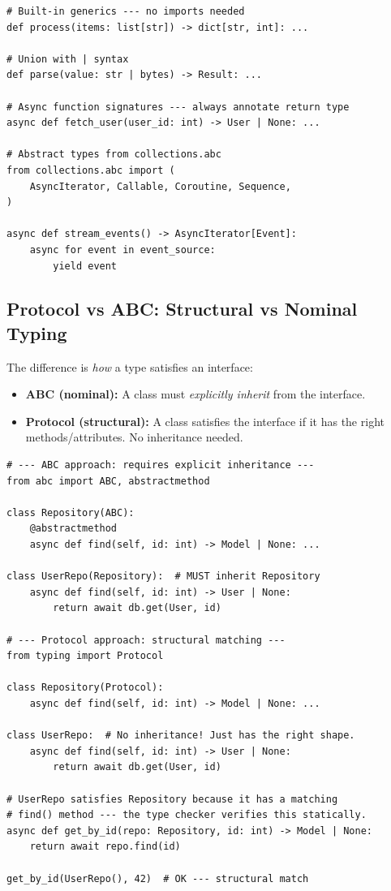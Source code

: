 \documentclass[11pt,a4paper,oneside]{book}
\begin{document}
\begin{lstlisting}[style=python]
# Built-in generics --- no imports needed
def process(items: list[str]) -> dict[str, int]: ...

# Union with | syntax
def parse(value: str | bytes) -> Result: ...

# Async function signatures --- always annotate return type
async def fetch_user(user_id: int) -> User | None: ...

# Abstract types from collections.abc
from collections.abc import (
    AsyncIterator, Callable, Coroutine, Sequence,
)

async def stream_events() -> AsyncIterator[Event]:
    async for event in event_source:
        yield event
\end{lstlisting}

\subsection{Protocol vs ABC: Structural vs Nominal Typing}

The difference is \emph{how} a type satisfies an interface:

\begin{itemize}
    \item \textbf{ABC (nominal):} A class must \emph{explicitly inherit} from the interface.
    \item \textbf{Protocol (structural):} A class satisfies the interface if it has the right
          methods/attributes. No inheritance needed.
\end{itemize}

\begin{lstlisting}[style=python]
# --- ABC approach: requires explicit inheritance ---
from abc import ABC, abstractmethod

class Repository(ABC):
    @abstractmethod
    async def find(self, id: int) -> Model | None: ...

class UserRepo(Repository):  # MUST inherit Repository
    async def find(self, id: int) -> User | None:
        return await db.get(User, id)

# --- Protocol approach: structural matching ---
from typing import Protocol

class Repository(Protocol):
    async def find(self, id: int) -> Model | None: ...

class UserRepo:  # No inheritance! Just has the right shape.
    async def find(self, id: int) -> User | None:
        return await db.get(User, id)

# UserRepo satisfies Repository because it has a matching
# find() method --- the type checker verifies this statically.
async def get_by_id(repo: Repository, id: int) -> Model | None:
    return await repo.find(id)

get_by_id(UserRepo(), 42)  # OK --- structural match
\end{lstlisting}
\end{document}
